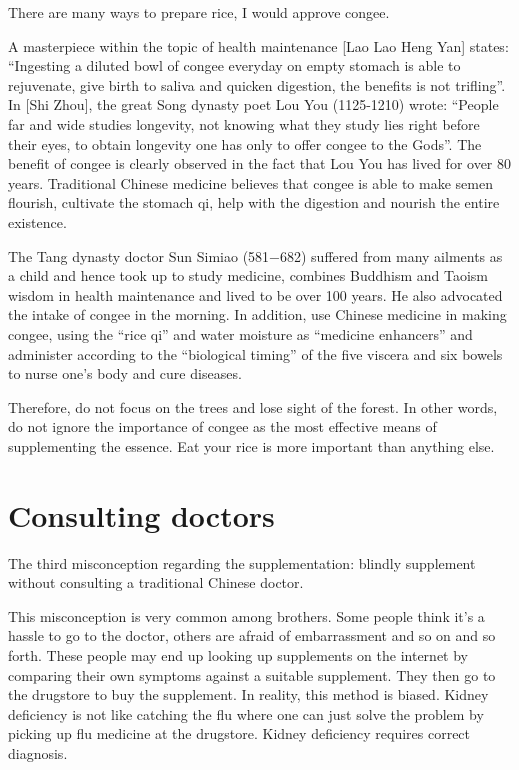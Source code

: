 \documentclass[
]{book}
\begin{document}
There are many ways to prepare rice, I would approve congee.

A masterpiece within the topic of health maintenance {[}Lao Lao Heng Yan{]} states: ``Ingesting a diluted bowl of congee everyday on empty stomach is able to rejuvenate, give birth to saliva and quicken digestion, the benefits is not trifling''. In {[}Shi Zhou{]}, the great Song dynasty poet Lou You (1125-1210) wrote: ``People far and wide studies longevity, not knowing what they study lies right before their eyes, to obtain longevity one has only to offer congee to the Gods''. The benefit of congee is clearly observed in the fact that Lou You has lived for over 80 years. Traditional Chinese medicine believes that congee is able to make semen flourish, cultivate the stomach qi, help with the digestion and nourish the entire existence.

The Tang dynasty doctor Sun Simiao (581−682) suffered from many ailments as a child and hence took up to study medicine, combines Buddhism and Taoism wisdom in health maintenance and lived to be over 100 years. He also advocated the intake of congee in the morning. In addition, use Chinese medicine in making congee, using the ``rice qi'' and water moisture as ``medicine enhancers'' and administer according to the ``biological timing'' of the five viscera and six bowels to nurse one's body and cure diseases.

Therefore, do not focus on the trees and lose sight of the forest. In other words, do not ignore the importance of congee as the most effective means of supplementing the essence. Eat your rice is more important than anything else.

\hypertarget{consulting-doctors}{%
\section{Consulting doctors}\label{consulting-doctors}}

The third misconception regarding the supplementation: blindly supplement without consulting a traditional Chinese doctor.

This misconception is very common among brothers. Some people think it's a hassle to go to the doctor, others are afraid of embarrassment and so on and so forth. These people may end up looking up supplements on the internet by comparing their own symptoms against a suitable supplement. They then go to the drugstore to buy the supplement. In reality, this method is biased. Kidney deficiency is not like catching the flu where one can just solve the problem by picking up flu medicine at the drugstore. Kidney deficiency requires correct diagnosis.
\end{document}

